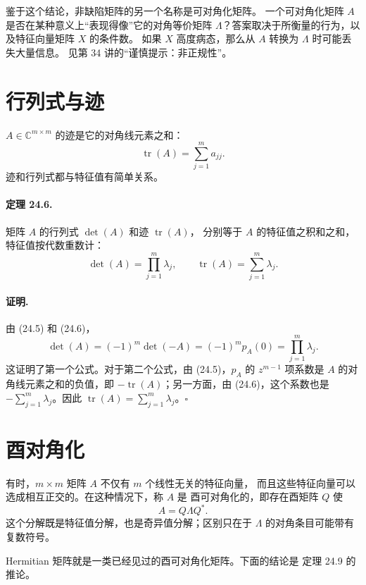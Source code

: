 \documentclass[UTF8,fontset=none,12pt]{ctexart}
\begin{document}
鉴于这个结论，非缺陷矩阵的另一个名称是可对角化矩阵。
一个可对角化矩阵 $A$ 是否在某种意义上“表现得像”它的对角等价矩阵
$\Lambda$？答案取决于所衡量的行为，以及特征向量矩阵 $X$ 的条件数。
如果 $X$ 高度病态，那么从 $A$ 转换为 $\Lambda$ 时可能丢失大量信息。
见第 34 讲的“谨慎提示：非正规性”。

\section*{行列式与迹}

$A\in\mathbb{C}^{m\times m}$ 的迹是它的对角线元素之和：
\[
\operatorname{tr}(A)=\sum_{j=1}^m a_{jj}.
\]
迹和行列式都与特征值有简单关系。

\paragraph{定理 24.6.}
矩阵 $A$ 的行列式 $\det(A)$ 和迹 $\operatorname{tr}(A)$，
分别等于 $A$ 的特征值之积和之和，特征值按代数重数计：
\begin{equation}
\det(A)=\prod_{j=1}^{m}\lambda_j,
\qquad
\operatorname{tr}(A)=\sum_{j=1}^{m}\lambda_j.
\tag{24.8}
\end{equation}

\paragraph{证明.}
由 (24.5) 和 (24.6)，
\[
\det(A)=(-1)^m\det(-A)=(-1)^mp_A(0)=\prod_{j=1}^{m}\lambda_j.
\]
这证明了第一个公式。对于第二个公式，由 (24.5)，$p_A$ 的
$z^{m-1}$ 项系数是 $A$ 的对角线元素之和的负值，即
$-\operatorname{tr}(A)$；另一方面，由 (24.6)，这个系数也是
$-\sum_{j=1}^{m}\lambda_j$。因此
$\operatorname{tr}(A)=\sum_{j=1}^{m}\lambda_j$。\hfill$\square$

\section*{酉对角化}

有时，$m\times m$ 矩阵 $A$ 不仅有 $m$ 个线性无关的特征向量，
而且这些特征向量可以选成相互正交的。在这种情况下，称 $A$ 是
酉可对角化的，即存在酉矩阵 $Q$ 使
\begin{equation}
A=Q\Lambda Q^*.
\tag{24.9}
\end{equation}
这个分解既是特征值分解，也是奇异值分解；区别只在于 $\Lambda$
的对角条目可能带有复数符号。

Hermitian 矩阵就是一类已经见过的酉可对角化矩阵。下面的结论是
定理 24.9 的推论。
\end{document}
